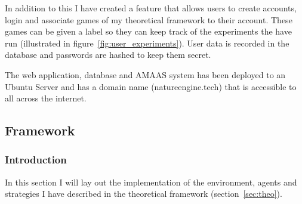 \documentclass[]{final_report}
\begin{document}
In addition to this I have created a feature that allows users to create accounts, login and associate games of my theoretical framework to their account. These games can be given a label so they can keep track of the experiments the have run (illustrated in figure~\ref{fig:user_experiments}). User data is recorded in the database and passwords are hashed to keep them secret.\par
The web application, database and AMAAS system has been deployed to an Ubuntu Server and has a domain name (natureengine.tech) that is accessible to all across the internet.

\subsection{Framework}
\subsubsection{Introduction}
In this section I will lay out the implementation of the environment, agents and strategies I have described in the theoretical framework (section~\ref{sec:theo}). 
\end{document}
